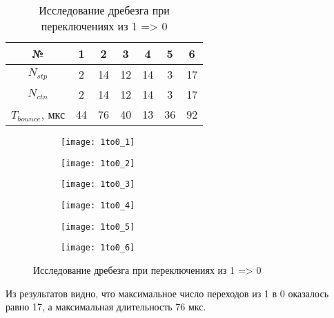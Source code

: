 \begin{table}[H]
	\def\tabcolsep{20pt}
	\centering
	\caption{Исследование дребезга при переключениях из 1 => 0}
	\label{tab:1to0}
	\begin{tabular}{|c|c|c|c|c|c|c|}
		\hline
		№ & 1 & 2 & 3 & 4 & 5 & 6 \\ \hline
		$N_{stp}$ & 2 & 14 & 12 & 14 & 3 & 17 \\ \hline
		$N_{ctn}$ & 2 & 14 & 12 & 14 & 3 & 17 \\ \hline
		$T_{bounce}$, мкс & 44 & 76 & 40 & 13 & 36 & 92 \\ \hline
	\end{tabular}
\end{table}

\begin{figure}[H]
	\centering
	\begin{subfigure}[b]{\textwidth}
		\centering
		\texttt{[image: 1to0\_1]}
		\vspace{0.2cm}
	\end{subfigure}
	\begin{subfigure}[b]{\textwidth}
		\centering
		\texttt{[image: 1to0\_2]}
		\vspace{0.2cm}
	\end{subfigure}
	\begin{subfigure}[b]{\textwidth}
		\centering
		\texttt{[image: 1to0\_3]}
		\vspace{0.2cm}
	\end{subfigure}
	\begin{subfigure}[b]{\textwidth}
		\centering
		\texttt{[image: 1to0\_4]}
		\vspace{0.2cm}
	\end{subfigure}
	\begin{subfigure}[b]{\textwidth}
		\centering
		\texttt{[image: 1to0\_5]}
		\vspace{0.2cm}
	\end{subfigure}
	\begin{subfigure}[b]{\textwidth}
		\centering
		\texttt{[image: 1to0\_6]}
		\vspace{0.2cm}
	\end{subfigure}
	\caption{Исследование дребезга при переключениях из 1 => 0}
	\label{fig:1to0}
\end{figure}

Из результатов видно, что максимальное число переходов из 1 в 0 оказалось равно 17, а максимальная длительность 76 мкс.

